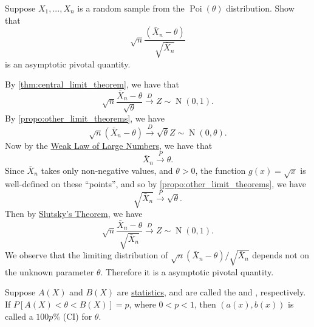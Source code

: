 \documentclass[notoc,notitlepage]{tufte-book}
\DeclareMathOperator{\Poi}{Poi }
\DeclareMathOperator{\Nor}{N }
\newcommand{\convd}{\overset{D}{\to}}
\newcommand{\convp}{\overset{P}{\to}}
\begin{document}
\begin{eg}
  Suppose $X_1, ..., X_n$ is a random sample from the $\Poi(\theta)$ distribution. Show that
  \begin{equation*}
    \sqrt{n} \frac{(\bar{X}_n - \theta)}{\sqrt{\bar{X}_n}}
  \end{equation*}
  is an asymptotic pivotal quantity.
\end{eg}

\begin{solution}
  By \cref{thm:central_limit_theorem}, we have that
  \begin{equation*}
    \sqrt{n} \frac{\bar{X}_n - \theta}{\sqrt{\theta}} \convd Z \sim \Nor(0, 1).
  \end{equation*}
  By \cref{propo:other_limit_theorems}, we have
  \begin{equation*}
    \sqrt{n} ( \bar{X}_n - \theta ) \convd \sqrt{\theta} Z \sim \Nor(0, \theta).
  \end{equation*}
  Now by the \hyperref[eg:weak_law_of_large_numbers]{Weak Law of Large Numbers}, we have that
  \begin{equation*}
    \bar{X}_n \convp \theta.
  \end{equation*}
  Since $\bar{X}_n$ takes only non-negative values, and $\theta > 0$, the function $g(x) = \sqrt{x}$ is well-defined on these ``points'', and so by \cref{propo:other_limit_theorems}, we have
  \begin{equation*}
    \sqrt{\bar{X}_n} \convp \sqrt{\theta}.
  \end{equation*}
  Then by \hyperref[propo:other_limit_theorems]{Slutsky's Theorem}, we have
  \begin{equation*}
    \sqrt{n} \frac{\bar{X}_n - \theta}{\sqrt{\bar{X}_n}} \convd Z \sim \Nor(0, 1).
  \end{equation*}
  We observe that the limiting distribution of $\sqrt{n}(\bar{X}_n - \theta) / \sqrt{\bar{X}_n}$ depends not on the unknown parameter $\theta$. Therefore it is a asymptotic pivotal quantity.
\end{solution}

\begin{defn}
\label{defn:confidence_interval}
  Suppose $A(X)$ and $B(X)$ are \hyperref[defn:statistic]{statistics}, and are called the  and , respectively. If $P[A(X) < \theta < B(X)] = p$, where $0 < p < 1$, then $(a(x), b(x))$ is called a $100p\%$  (CI) for $\theta$.
\end{defn}
\end{document}
